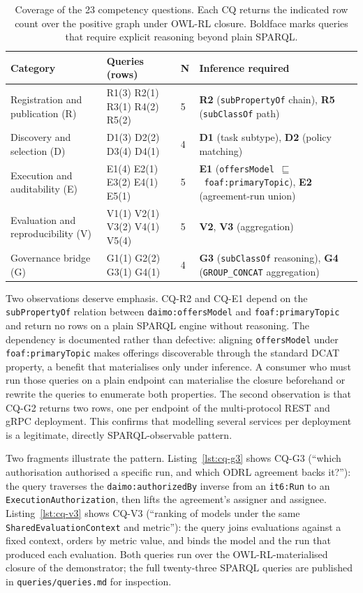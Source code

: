 \documentclass[Afour,sagev,times]{sagej}
\newcommand{\code}[1]{\texttt{#1}}
\begin{document}
\begin{table}[t]
\small\sf\centering
\caption{Coverage of the 23 competency questions. Each CQ returns the indicated row count over the positive graph under OWL-RL closure. Boldface marks queries that require explicit reasoning beyond plain SPARQL.\label{tab:cqs}}
\begin{tabular}{@{}p{3.3cm}p{2.6cm}p{0.8cm}p{6.3cm}@{}}
\toprule
\textbf{Category} & \textbf{Queries (rows)} & \textbf{N} & \textbf{Inference required} \\
\midrule
Registration and publication (R) & R1(3) R2(1) R3(1) R4(2) R5(2) & 5 & \textbf{R2} (\code{subPropertyOf} chain), \textbf{R5} (\code{subClassOf} path) \\
Discovery and selection (D) & D1(3) D2(2) D3(4) D4(1) & 4 & \textbf{D1} (task subtype), \textbf{D2} (policy matching) \\
Execution and auditability (E) & E1(4) E2(1) E3(2) E4(1) E5(1) & 5 & \textbf{E1} (\code{offersModel}~$\sqsubseteq$~\code{foaf:primaryTopic}), \textbf{E2} (agreement-run union) \\
Evaluation and reproducibility (V) & V1(1) V2(1) V3(2) V4(1) V5(4) & 5 & \textbf{V2}, \textbf{V3} (aggregation) \\
Governance bridge (G) & G1(1) G2(2) G3(1) G4(1) & 4 & \textbf{G3} (\code{subClassOf} reasoning), \textbf{G4} (\code{GROUP\_CONCAT} aggregation) \\
\bottomrule
\end{tabular}
\end{table}

Two observations deserve emphasis. CQ-R2 and CQ-E1 depend on the \code{subPropertyOf} relation between \code{daimo:offersModel} and \code{foaf:primaryTopic} and return no rows on a plain SPARQL engine without reasoning. The dependency is documented rather than defective: aligning \code{offersModel} under \code{foaf:primaryTopic} makes offerings discoverable through the standard DCAT property, a benefit that materialises only under inference. A consumer who must run those queries on a plain endpoint can materialise the closure beforehand or rewrite the queries to enumerate both properties. The second observation is that CQ-G2 returns two rows, one per endpoint of the multi-protocol REST and gRPC deployment. This confirms that modelling several services per deployment is a legitimate, directly SPARQL-observable pattern.

Two fragments illustrate the pattern. Listing~\ref{lst:cq-g3} shows CQ-G3 (``which authorisation authorised a specific run, and which ODRL agreement backs it?''): the query traverses the \code{daimo:authorizedBy} inverse from an \code{it6:Run} to an \code{ExecutionAuthorization}, then lifts the agreement's assigner and assignee. Listing~\ref{lst:cq-v3} shows CQ-V3 (``ranking of models under the same \code{SharedEvaluationContext} and metric''): the query joins evaluations against a fixed context, orders by metric value, and binds the model and the run that produced each evaluation. Both queries run over the OWL-RL-materialised closure of the demonstrator; the full twenty-three SPARQL queries are published in \code{queries/queries.md} for inspection.
\end{document}
